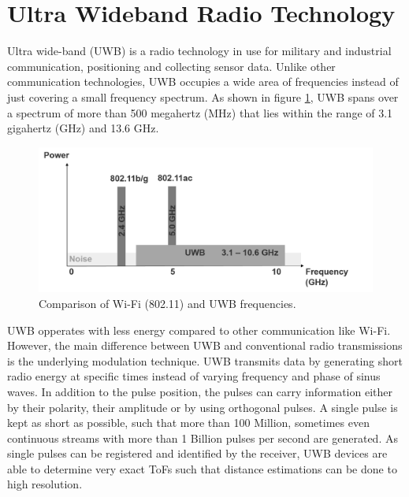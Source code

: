 

\section{Ultra Wideband Radio Technology}
Ultra wide-band (UWB) is a radio technology in use for military and industrial communication, positioning and collecting sensor data. Unlike other communication technologies, UWB occupies a wide area of frequencies instead of just covering a small frequency spectrum. As shown in figure \ref{fig:frequency_spectrum}, UWB spans over a spectrum of more than 500 megahertz (MHz) that lies within the range of 3.1 gigahertz (GHz) and 13.6 GHz.
\begin{figure}[th]
\centering
\includegraphics[width=1.0\textwidth]{Figures/frequency_spectrum}
\decoRule
\caption[UWB Frequency Spectrum]{Comparison of Wi-Fi (802.11) and UWB frequencies.}
\label{fig:frequency_spectrum}
\end{figure}
UWB opperates with less energy compared to other communication like Wi-Fi. However, the main difference between UWB and conventional radio transmissions is the underlying modulation technique. UWB transmits data by generating short radio energy at specific times instead of varying frequency and phase of sinus waves. In addition to the pulse position, the pulses can carry information either by their polarity, their amplitude or by using orthogonal pulses.
A single pulse is kept as short as possible, such that more than 100 Million, sometimes even continuous streams with more than 1 Billion pulses per second are generated. As single pulses can be registered and identified by the receiver, UWB devices are able to determine very exact ToFs such that distance estimations can be done to high resolution.\\
